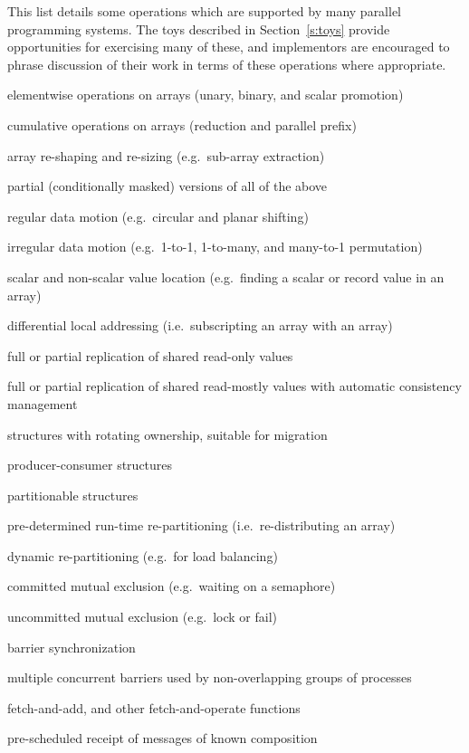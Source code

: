 This list details some operations which are supported by many parallel programming systems.
The toys described in Section~\ref{s:toys} provide opportunities for exercising many of these,
and implementors are encouraged to phrase discussion of their work in terms of these operations where appropriate.

\begin{small}
\begin{toylist}
\item	elementwise operations on arrays (unary, binary, and scalar promotion)
\item	cumulative operations on arrays (reduction and parallel prefix)
\item	array re-shaping and re-sizing (e.g.\ sub-array extraction)
\item	partial (conditionally masked) versions of all of the above
\item	regular data motion (e.g.\ circular and planar shifting)
\item	irregular data motion (e.g.\ 1-to-1, 1-to-many, and many-to-1 permutation)
\item	scalar and non-scalar value location (e.g.\ finding a scalar or record value in an array)
\item	differential local addressing (i.e.\ subscripting an array with an array)
\item	full or partial replication of shared read-only values
\item	full or partial replication of shared read-mostly values with automatic consistency management
\item	structures with rotating ownership, suitable for migration
\item	producer-consumer structures
\item	partitionable structures
\item	pre-determined run-time re-partitioning (i.e.\ re-distributing an array)
\item	dynamic re-partitioning (e.g.\ for load balancing)
\item	committed mutual exclusion (e.g.\ waiting on a semaphore)
\item	uncommitted mutual exclusion (e.g.\ lock or fail)
\item	barrier synchronization
\item	multiple concurrent barriers used by non-overlapping groups of processes
\item	fetch-and-add, and other fetch-and-operate functions
\item	pre-scheduled receipt of messages of known composition

\end{toylist}
\end{small}
